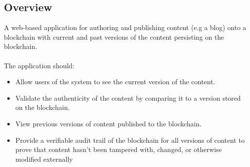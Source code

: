 \subsection{Overview}

A web-based application for authoring and publishing content (e.g a blog) onto a 
blockchain with current and past versions of the content persisting on the blockchain. 
\\ \\The application should: 
\begin{itemize}
    \item Allow users of the system to see the current version of the content.
    \item Validate the authenticity of the content by comparing it to a version stored on the blockchain.
    \item View previous versions of content published to the blockchain.
    \item Provide a verifiable audit trail of the blockchain for all versions of 
		  content to prove that content hasn’t been tampered with, 
          changed, or otherwise modified externally
\end{itemize}
